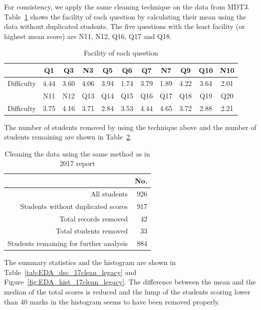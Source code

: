 \documentclass[a4paper]{report}
\begin{document}
For consistency, we apply the same cleaning technique on the data from MDT3. Table~\ref{tab:EDA_difficulty} shows the facility of each question by calculating their mean using the data without duplicated students. The five questions with the least facility (or highest mean score) are N11, N12, Q16, Q17 and Q18. 

\begin{table}[ht]
  \centering
  \begin{tabular}{ccccccccccc}
    \hline
    & Q1 & Q3 & N3 & Q5 & Q6 & Q7 & N7 & Q9 & Q10 & N10 \\ 
     \hline
   Difficulty & 4.44 & 3.60 & 4.06 & 3.94 & 1.74 & 3.79 & 1.89 & 4.22 & 3.64 & 2.01 \\ 
      \hline
     \hline
    & N11 & N12 & Q13 & Q14 & Q15 & Q16 & Q17 & Q18 & Q19 & Q20 \\ 
     \hline
   Difficulty & 3.75 & 4.16 & 3.71 & 2.84 & 3.53 & 4.44 & 4.65 & 3.72 & 2.88 & 2.21 \\ 
      \hline
  \end{tabular}
  \caption{\label{tab:EDA_difficulty}Facility of each question}
\end{table}

The number of students removed by using the technique above and the number of students remaining are shown in Table~\ref{tab:EDA_count_clean_legacy}. 

\begin{table}[ht]
  \centering
  \begin{tabular}{rr}
    \hline
   & No. \\ 
    \hline
  All students & 926 \\ 
    Students without duplicated scores & 917 \\
    Total records removed & 42 \\
    Total students removed &  33 \\ 
    Students remaining for further analysis & 884 \\ 
     \hline
  \end{tabular}
  \caption{\label{tab:EDA_count_clean_legacy}Cleaning the data using the same method as in 2017 report}
\end{table}

The summary statistics and the histogram are shown in Table~\ref{tab:EDA_dsc_17clean_legacy} and Figure~\ref{fig:EDA_hist_17clean_legacy}. The difference between the mean and the median of the total scores is reduced and the lump of the students scoring lower than 40 marks in the histogram seems to have been removed properly. 
\end{document}
